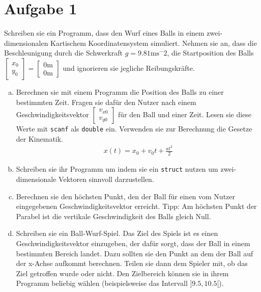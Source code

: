 \documentclass{standalone}
\begin{document}
\section{Aufgabe 1}
    Schreiben sie ein Programm, dass den Wurf eines Balls in einem zwei-dimensionalen Kartischem Koordinatensystem simuliert. Nehmen sie an, dass die Beschleunigung durch die Schwerkraft $g=9.81\text{ms}^-2$, die Startposition des Balls $\begin{bmatrix}x_0\\y_0\end{bmatrix}=\begin{bmatrix}0\text{m}\\0\text{m}\end{bmatrix}$ und ignorieren sie jegliche Reibungskräfte.

\begin{enumerate}[a)]
\item
    Berechnen sie mit einem Programm die Position des Balls zu einer bestimmten Zeit. Fragen sie dafür den Nutzer nach einem Geschwindigkeitsvektor $\begin{bmatrix}v_{x0}\\v_{y0}\end{bmatrix}$ für den Ball und einer Zeit. Lesen sie diese Werte mit \texttt{scanf} als \texttt{double} ein. Verwenden sie zur Berechnung die Gesetze der Kinematik.
    \begin{align*}
        x(t)=x_0+v_0t+\frac{at^2}{2}
    \end{align*}

\item
    Schreiben sie ihr Programm um indem sie ein \texttt{struct} nutzen um zwei-dimensionale Vektoren sinnvoll darzustellen.

\item
    Berechnen sie den höchsten Punkt, den der Ball für einen vom Nutzer eingegebenen Geschwindigkeitsvektor erreicht. Tipp: Am höchsten Punkt der Parabel ist die vertikale Geschwindigkeit des Balls gleich Null.

\item
    Schreiben sie ein Ball-Wurf-Spiel. Das Ziel des Spiels ist es einen Geschwindigkeitsvektor einzugeben, der dafür sorgt, dass der Ball in einem bestimmten Bereich landet. Dazu sollten sie den Punkt an dem der Ball auf der x-Achse aufkommt berechnen. Teilen sie dann dem Spieler mit, ob das Ziel getroffen wurde oder nicht. Den Zielbereich können sie in ihrem Programm beliebig wählen (beispielsweise das Intervall $]9.5,10.5[$).

\end{enumerate}
\end{document}
